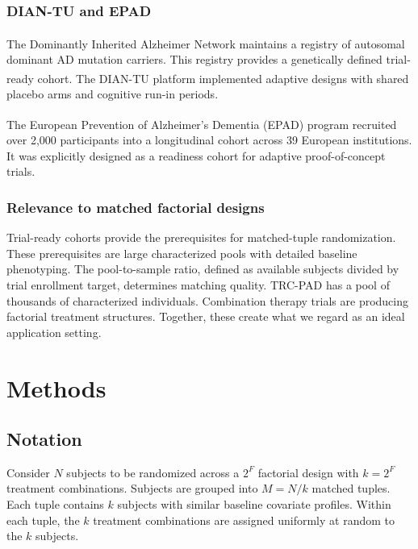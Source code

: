 \documentclass[
  11pt,
]{article}
\begin{document}
\subsubsection{DIAN-TU and EPAD}\label{dian-tu-and-epad}

The Dominantly Inherited Alzheimer Network\textsuperscript{} maintains a registry of autosomal dominant
AD mutation carriers. This registry provides a genetically
defined trial-ready cohort. The DIAN-TU platform\textsuperscript{} implemented adaptive designs with shared
placebo arms and cognitive run-in periods.

The European Prevention of Alzheimer's Dementia (EPAD)
program\textsuperscript{} recruited over 2,000 participants
into a longitudinal cohort across 39 European institutions.
It was explicitly designed as a readiness cohort for adaptive
proof-of-concept trials.

\subsubsection{Relevance to matched factorial designs}\label{relevance-to-matched-factorial-designs}

Trial-ready cohorts provide the prerequisites for
matched-tuple randomization. These prerequisites are large
characterized pools with detailed baseline phenotyping. The
pool-to-sample ratio, defined as available subjects divided
by trial enrollment target, determines matching quality.
TRC-PAD has a pool of thousands of characterized individuals.
Combination therapy trials are producing factorial treatment
structures. Together, these create what we regard as an ideal
application setting.

\section{Methods}\label{methods}

\subsection{Notation}\label{notation}

Consider \(N\) subjects to be randomized across a \(2^F\)
factorial design with \(k = 2^F\) treatment combinations.
Subjects are grouped into \(M = N/k\) matched tuples. Each
tuple contains \(k\) subjects with similar baseline covariate
profiles. Within each tuple, the \(k\) treatment combinations
are assigned uniformly at random to the \(k\) subjects.
\end{document}
